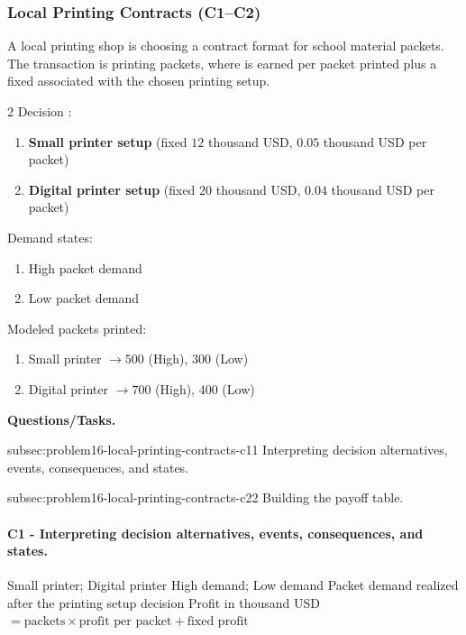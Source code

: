 	\subsubsection{Local Printing Contracts (C1--C2)}
	\label{sec:problem16-local-printing-contracts-c1-c2}
	A local printing shop is choosing a contract format for school material packets. The transaction is printing packets, where  is earned per packet printed plus a fixed  associated with the chosen printing setup.

	\begin{multicols}{2}
		Decision :
		\begin{enumerate}[label=\arabic*.]
			\item \textbf{Small printer setup} (fixed  $12$ thousand USD,  $0.05$ thousand USD per packet)
			\item \textbf{Digital printer setup} (fixed  $20$ thousand USD,  $0.04$ thousand USD per packet)
		\end{enumerate}

		Demand states:
		\begin{enumerate}[label=\arabic*.]
			\item High packet demand
			\item Low packet demand
		\end{enumerate}

			\columnbreak

		Modeled packets printed:
		\begin{enumerate}[label=\arabic*.]
			\item Small printer $\to 500$ (High), $300$ (Low)
			\item Digital printer $\to 700$ (High), $400$ (Low)
		\end{enumerate}
	\end{multicols}

	\textbf{Questions/Tasks.}
	\begin{enumerate}
		\CriterionTask
		{subsec:problem16-local-printing-contracts-c1}{1}
		{Interpreting decision alternatives, events, consequences, and states.}

		\CriterionTask
		{subsec:problem16-local-printing-contracts-c2}{2}
		{Building the payoff table.}
	\end{enumerate}

	\paragraph*{C1 - Interpreting decision alternatives, events, consequences, and states.}
	\label{subsec:problem16-local-printing-contracts-c1}
	\DecisionElementsTable
	{Small printer; Digital printer}
	{High demand; Low demand}
	{Packet demand realized after the printing setup decision}
	{Profit in thousand USD $= \text{packets} \times \text{profit per packet} + \text{fixed profit}$}


